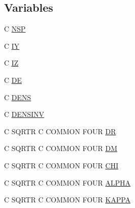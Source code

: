 \subsection*{Variables}
\begin{DoxyCompactItemize}
\item 
C \hyperlink{four_8com_aa0cef1d162909c91ecc4ab6954d16e82}{N\-S\-P}
\item 
C \hyperlink{four_8com_aae2e60235ec6f4303575becb746f40ea}{I\-Y}
\item 
C \hyperlink{four_8com_ac8f0d60b0a4b9156d24fd433099b8c49}{I\-Z}
\item 
C \hyperlink{four_8com_a3a2f491799a3e573efcadd5d7318cb0c}{D\-E}
\item 
C \hyperlink{four_8com_ac6b99276f56a09eacc1bec701e2fd463}{D\-E\-N\-S}
\item 
C \hyperlink{four_8com_ab3697c20897d6f0c2fbd38fc17234f25}{D\-E\-N\-S\-I\-N\-V}
\item 
C S\-Q\-R\-T\-R C C\-O\-M\-M\-O\-N F\-O\-U\-R \hyperlink{four_8com_abfc8949be769882c767d392a1c43a3d6}{D\-R}
\item 
C S\-Q\-R\-T\-R C C\-O\-M\-M\-O\-N F\-O\-U\-R \hyperlink{four_8com_a52098fe796b882decbac20a67cd7a174}{D\-M}
\item 
C S\-Q\-R\-T\-R C C\-O\-M\-M\-O\-N F\-O\-U\-R \hyperlink{four_8com_adcda87f0444de21ee7a1b42d0a5c4080}{C\-H\-I}
\item 
C S\-Q\-R\-T\-R C C\-O\-M\-M\-O\-N F\-O\-U\-R \hyperlink{four_8com_a6cd48f9abc4bb80fe87f0cc6c8be9605}{A\-L\-P\-H\-A}
\item 
C S\-Q\-R\-T\-R C C\-O\-M\-M\-O\-N F\-O\-U\-R \hyperlink{four_8com_a6742b6884a0c5a19eb85277ca4dd8d1b}{K\-A\-P\-P\-A}
\end{DoxyCompactItemize}


